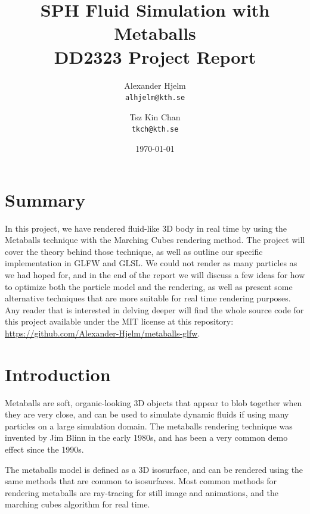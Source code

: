 \documentclass{article}
\begin{document}
    \title{
    	\textbf{SPH Fluid Simulation with Metaballs} \\
    	\large DD2323 Project Report \\}
   	\author{
		Alexander Hjelm\\
		\texttt{alhjelm@kth.se}
		\and
		Tsz Kin Chan\\
		\texttt{tkch@kth.se}
	}
    \date{\today}

    \maketitle
    
    \begin{multicols}{2}

    \section{Summary}
        In this project, we have rendered fluid-like 3D body in real time by using the Metaballs technique with the Marching Cubes rendering method. The project will cover the theory behind those technique, as well as outline our specific implementation in GLFW and GLSL. We could not render as many particles as we had hoped for, and in the end of the report we will discuss a few ideas for how to optimize both the particle model and the rendering, as well as present some alternative techniques that are more suitable for real time rendering purposes. Any reader that is interested in delving deeper will find the whole source code for this project available under the MIT license at this repository: \url{https://github.com/Alexander-Hjelm/metaballs-glfw}.
    
    \section{Introduction}
     
		Metaballs are soft, organic-looking 3D objects that appear to blob together when they are very close, and can be used to simulate dynamic fluids if using many particles on a large simulation domain. 
		The metaballs rendering technique was invented by Jim Blinn in the early 1980s, and has been a very common demo effect since the 1990s.
	
		The metaballs model is defined as a 3D isosurface, and can be rendered using the same methods that are common to isosurfaces. Most common methods for rendering metaballs are ray-tracing for still image and animations, and the marching cubes algorithm for real time.
		\cite{heckbert92}


\end{multicols}
\end{document}
